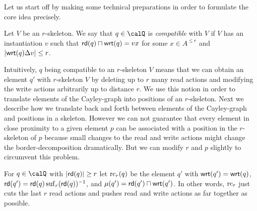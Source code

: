 Let us start off by making some technical preparations in order to formulate the core idea precisely.
\begin{definition}
	Let $V$ be an $r$-skeleton. We say that $q\in\Qx$ is \emph{compatible} with $V$ 
	if $V$ has an instantiation $v$ such that $\mathsf{rd}(q) \sqcap \mathsf{wrt}(q)= vx$ for some $x\in A^{\leq r}$ and 
	$|\mathsf{wrt}(q) \Delta v| \leq r$.
\end{definition}
Intuitively, $q$ being compatible to an $r$-skeleton $V$ means that we can obtain an element
$q'$ with $r$-skeleton $V$ by deleting up to $r$ many read actions and modifying the write
actions arbitrarily up to distance $r$. We use this notion in order to translate elements of the Cayley-graph
into positions of an $r$-skeleton. Next we describe how we translate back and forth between elements of the Cayley-graph and positions in a skeleton.
However we can not guarantee that every element in close proximity to a given element $p$ can be associated with a position in the $r$-skeleton of $p$ because small changes to the read and write actions might change the border-decomposition dramatically. But we can modify
$r$ and $p$ slightly to circumvent this problem.  
\begin{definition}
	For $q\in\Qx$ with $|\mathsf{rd}(q)| \geq r$ let $\operatorname{rc}_r(q)$ be the element $q'$  with $\mathsf{wrt}(q') = \mathsf{wrt}(q)$, $\mathsf{rd}(q')=\mathsf{rd}(q)\operatorname{suf}_{r}({\mathsf{rd}(q)})^{-1}$, and $\mu({q'}) = \mathsf{rd}(q') \sqcap \mathsf{wrt}(q')$.
	In other words, $\operatorname{rc}_r$ just cuts the last $r$ read actions and pushes read and write actions as far together as possible. 
\end{definition}
